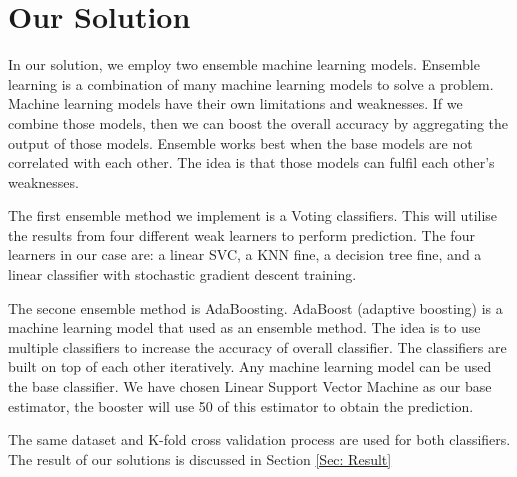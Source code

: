 \section{Our Solution}

In our solution, we employ two ensemble machine learning models.
Ensemble learning is a combination of many machine learning models to solve a problem.
Machine learning models have their own limitations and weaknesses. If we combine those models, then we can boost the overall accuracy by aggregating the output of those models.
Ensemble works best when the base models are not correlated with each other.
The idea is that those models can fulfil each other's weaknesses.

The first ensemble method we implement is a Voting classifiers.
This will utilise the results from four different weak learners to perform prediction.
The four learners in our case are: a linear SVC, a KNN fine, a decision tree fine, and a linear classifier with stochastic gradient descent training.

The secone ensemble method is AdaBoosting.
AdaBoost (adaptive boosting) is a machine learning model that used as an ensemble method.
The idea is to use multiple classifiers to increase the accuracy of overall classifier.
The classifiers are built on top of each other iteratively.
Any machine learning model can be used the base classifier.
We have chosen Linear Support Vector Machine as our base estimator, the booster will use 50 of this estimator to obtain the prediction.

The same dataset and K-fold cross validation process are used for both classifiers.
The result of our solutions is discussed in Section \ref{Sec: Result}